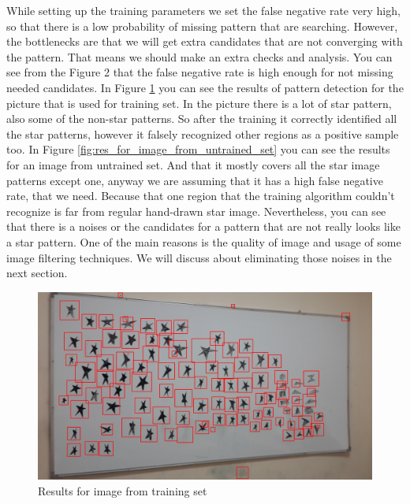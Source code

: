 While setting up the training parameters we set the false negative rate very high, so that there is a low probability of missing  pattern that are searching. However, the bottlenecks are that we will get extra candidates that are not converging with the pattern. That means we should make an extra checks and analysis. You can see from the Figure 2 that the false negative rate is high enough for not missing needed candidates. In Figure \ref{fig:res_for_training_set} you can see the results of pattern detection for the picture that is used for training set. In the picture there is a lot of star pattern, also some of the non-star patterns. So after the training it correctly identified all the star patterns, however it falsely recognized other regions as a positive sample too. In Figure \ref{fig:res_for_image_from_untrained_set} you can see the results for an image from untrained set. And that it mostly covers all the star image patterns except one, anyway we are assuming that it has a high false negative rate, that we need. Because that one region that the training algorithm couldn't recognize is far from regular hand-drawn star image. Nevertheless, you can see that there is a noises or the candidates for a pattern that are not really looks like a star pattern. One of the main reasons is the quality of image and usage of some image filtering techniques. We will discuss about eliminating those noises in the next section.

\begin{figure}[h]
    \centering
    \includegraphics[width=\textwidth]{Figures/res_for_training_set}
    \caption{Results for image from training set}
    \label{fig:res_for_training_set}
\end{figure}

